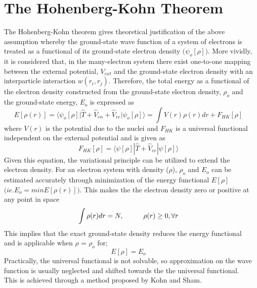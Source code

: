 \documentclass[a4paper,11pt]{report}
\begin{document}
\section{The Hohenberg-Kohn Theorem}
The Hohenberg-Kohn theorem \citep{hohenberg1964inhomogeneous} gives theoretical justification of the above assumption whereby the ground-state
wave function of a 
system of electrons is treated as a functional of its ground-state electron density $\big(\psi_{o}[\rho]\big)$. More vividly, it is considered that, in
the many-electron system there exist one-to-one mapping between the external potential, $V_{ext}$ and the ground-state electron density with
an interparticle interaction $w(r_{i},r_{j})$.
Therefore, the total energy as a functional of the electron
density constructed from the ground-state electron density, $\rho_{o}$ and the ground-state energy, $E_{o}$ is expressed as
\begin{equation}\label{eground}
 E[\rho(r)] = \big \langle\psi_{o}[\rho]\big|\hat{T}+\hat{V}_{en}+\hat{V}_{ee}\big|\psi_{o}[\rho]\big \rangle = \int V(r)\rho(r)dr + F_{HK}[\rho]
 \end{equation}
where $V(r)$ is the potential due to the nuclei and $F_{HK}$ is a universal functional independent on the external potential and is given as
\begin{equation}\label{fhk}
 F_{HK}[\rho] = \big \langle\psi[\rho]|\hat{T}+\hat{V}_{ee}|\psi[\rho]\big \rangle
 \end{equation}
Given this equation, the variational principle can be utilized to extend the electron density. For an electron
system with density ($\rho$), $\rho_{o}$ and $E_{o}$ can be estimated accurately through minimization of the energy functional $E[\rho]$ $\big(ie.
E_{o} = minE[\rho (r)]\big)$. 
This makes the the electron density zero or positive at any point in space
\begin{equation}\label{zero}
\int\rho(r)dr = N, \hspace{10mm} \rho(r) \geq 0, \forall r
\end{equation}
This implies that the exact ground-state density reduces the energy functional and is applicable when $\rho$ = $\rho_{o}$ for;
\begin{equation}\label{exact}
E[\rho] = E_{o}
\end{equation}
Practically, the universal functional is not solvable, so approximation on the wave function is usually neglected and shifted towards the 
the universal functional. This is achieved through a method proposed by Kohn and Sham. 
\end{document}
